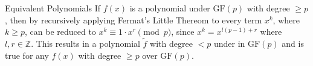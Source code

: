 \begin{homeworkProblem}{Equivalent Polynomials}
    If $f(x)$ is a polynomial under $\text{GF}(p)$ with degree $\geq p$, then by
    recursively applying Fermat's Little Thereom to every term $x^k$, where $k \geq 
    p$, can be reduced to $x^k \equiv 1 \cdot x^r \pmod{p}$, since $x^k = x^{l(p-1) 
    + r}$ where $l, r \in \mathbb{Z}$. This results in a polynomial $\tilde{f}$ with
    degree $< p$ under in $\text{GF}(p)$ and is true for any $f(x)$ with degree $\geq 
    p$ over $\text{GF}(p)$.


\end{homeworkProblem}